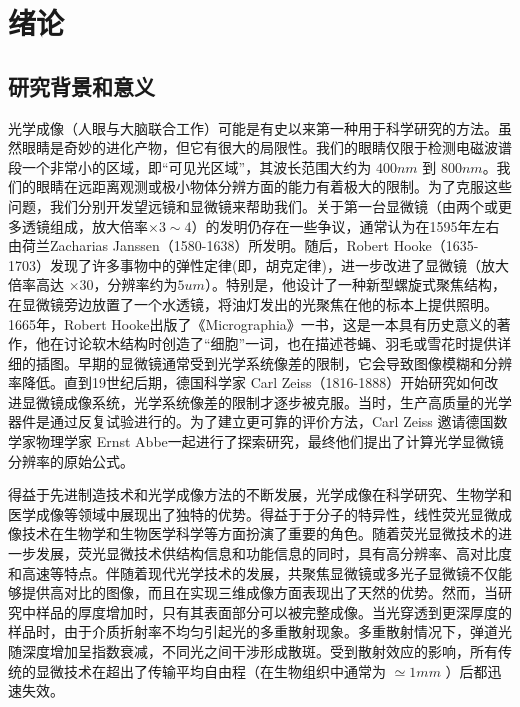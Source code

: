 
\chapter{绪论}\label{chap:1}
\section{研究背景和意义}
光学成像（人眼与大脑联合工作）可能是有史以来第一种用于科学研究的方法。虽然眼睛是奇妙的进化产物，但它有很大的局限性。我们的眼睛仅限于检测电磁波谱段一个非常小的区域，即“可见光区域”，其波长范围大约为 $400 nm$ 到 $800 nm$。我们的眼睛在远距离观测或极小物体分辨方面的能力有着极大的限制。为了克服这些问题，我们分别开发望远镜和显微镜来帮助我们。关于第一台显微镜（由两个或更多透镜组成，放大倍率$ \times 3 \sim 4$）的发明仍存在一些争议，通常认为在1595年左右由荷兰Zacharias Janssen（1580-1638）所发明。随后，Robert Hooke（1635-1703）发现了许多事物中的弹性定律(即，胡克定律)，进一步改进了显微镜（放大倍率高达 $ \times 30$，分辨率约为$5 um$）。特别是，他设计了一种新型螺旋式聚焦结构，在显微镜旁边放置了一个水透镜，将油灯发出的光聚焦在他的标本上提供照明。1665年，Robert Hooke出版了《Micrographia》\cite{robert_micrographia_2015}一书，这是一本具有历史意义的著作，他在讨论软木结构时创造了“细胞”一词，也在描述苍蝇、羽毛或雪花时提供详细的插图。早期的显微镜通常受到光学系统像差的限制，它会导致图像模糊和分辨率降低。直到19世纪后期，德国科学家 Carl Zeiss（1816-1888）开始研究如何改进显微镜成像系统，光学系统像差的限制才逐步被克服。当时，生产高质量的光学器件是通过反复试验进行的。为了建立更可靠的评价方法，Carl Zeiss 邀请德国数学家物理学家 Ernst Abbe一起进行了探索研究，最终他们提出了计算光学显微镜分辨率的原始公式\cite{abbe_beitrage_1873}。

得益于先进制造技术和光学成像方法的不断发展，光学成像在科学研究、生物学和医学成像等领域中展现出了独特的优势。得益于于分子的特异性，线性荧光显微成像技术在生物学和生物医学科学等方面扮演了重要的角色。随着荧光显微技术的进一步发展，荧光显微技术供结构信息和功能信息\cite{Lichtman2005}的同时，具有高分辨率、高对比度和高速等特点。伴随着现代光学技术的发展，共聚焦显微镜或多光子显微镜不仅能够提供高对比的图像，而且在实现三维成像方面表现出了天然的优势。然而，当研究中样品的厚度增加时，只有其表面部分可以被完整成像。当光穿透到更深厚度的样品时，由于介质折射率不均匀引起光的多重散射现象。多重散射情况下，弹道光随深度增加呈指数衰减，不同光之间干涉形成散斑\cite{Goodman1976}。受到散射效应的影响，所有传统的显微技术在超出了传输平均自由程（在生物组织中通常为 $\simeq 1 mm$ \cite{ntziachristos_going_2010}）后都迅速失效。


